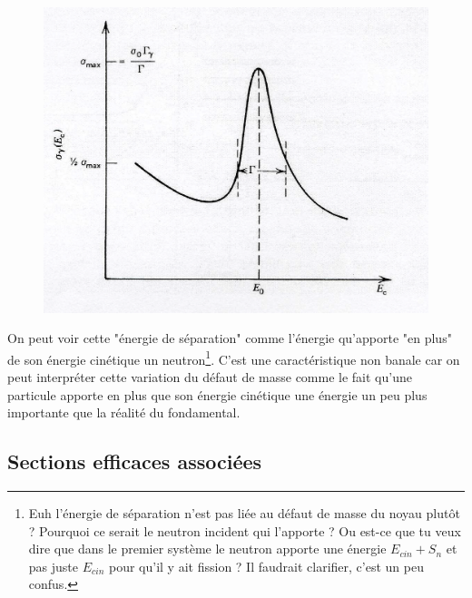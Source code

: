 	\begin{figure}
	\vspace{-8mm}
	\includegraphics[scale=0.17]{ch1/image9.png}
	\end{figure}
	
On peut voir cette "énergie de séparation" comme l'énergie qu'apporte "en plus" de son énergie 
cinétique un neutron\footnote{Euh l'énergie de séparation n'est pas liée au défaut de masse du noyau plutôt ?
Pourquoi ce serait le neutron incident qui l'apporte ? Ou est-ce que tu veux dire que dans le premier
système le neutron apporte une énergie $E_{cin}+S_n$ et pas juste $E_{cin}$ pour qu'il y ait fission ?
Il faudrait clarifier, c'est un peu confus.}.	
C'est une caractéristique non banale car on peut interpréter cette variation 
du défaut de masse comme le fait qu'une particule apporte en plus que son énergie cinétique une 
énergie un peu plus importante que la réalité du fondamental. 

\subsection{Sections efficaces associées}
